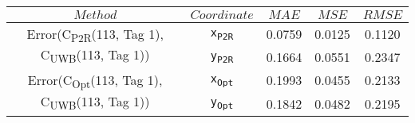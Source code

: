 \begin{table}[h]
\centering
\begin{tabular}{|c|c|c|c|c|}
\hline
$Method$ & $Coordinate$ & $MAE$ & $MSE$ & $RMSE$ \\
\hline
\multirow{2}{*}{{\footnotesize Error(C\textsubscript{P2R}(113, Tag 1), C\textsubscript{UWB}(113, Tag 1))}} & \texttt{x\textsubscript{P2R}} & 0.0759 & 0.0125 & 0.1120 \\
& \texttt{y\textsubscript{P2R}} & 0.1664 & 0.0551 & 0.2347 \\
\hline
\multirow{2}{*}{{\footnotesize Error(C\textsubscript{Opt}(113, Tag 1), C\textsubscript{UWB}(113, Tag 1))}} & \texttt{x\textsubscript{Opt}} & 0.1993 & 0.0455 & 0.2133 \\
& \texttt{y\textsubscript{Opt}} & 0.1842 & 0.0482 & 0.2195 \\
\hline
\end{tabular}
\end{table}
